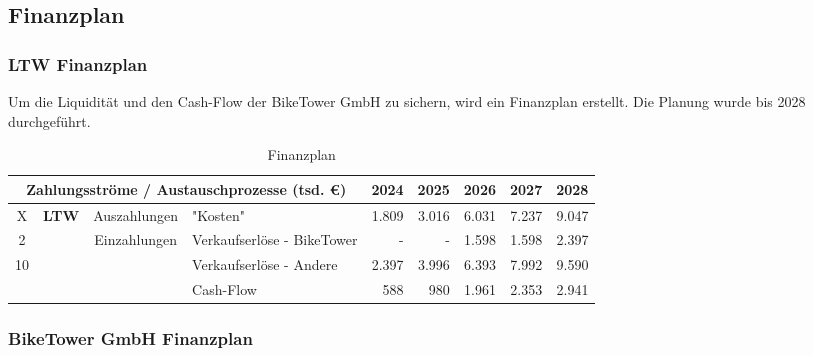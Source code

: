 \subsection{Finanzplan}

\subsubsection{LTW Finanzplan}

Um die Liquidität und den Cash-Flow der BikeTower GmbH zu sichern, wird ein Finanzplan erstellt. Die Planung wurde bis 2028 durchgeführt.

\begin{table}[H]
  \small
  \centering
  \begin{tabular}{ccclrrrrr}
    \toprule
    \multicolumn{4}{c}{\textbf{Zahlungsströme / Austauschprozesse} (tsd. \euro)} & \textbf{2024}                 & \textbf{2025}                 & \textbf{2026}              & \textbf{2027} & \textbf{2028}                         \\
    \midrule
    X                                                                            & \multirow{3}{*}{\textbf{LTW}} & Auszahlungen                  & "Kosten"                   & 1.809         & 3.016         & 6.031 & 7.237 & 9.047 \\
    2                                                                            &                               & \multirow{2}{*}{Einzahlungen} & Verkaufserlöse - BikeTower & -             & -             & 1.598 & 1.598 & 2.397 \\
    10                                                                           &                               &                               & Verkaufserlöse - Andere    & 2.397         & 3.996         & 6.393 & 7.992 & 9.590 \\
    \midrule
                                                                                 &                               &                               & Cash-Flow                  & 588           & 980           & 1.961 & 2.353 & 2.941 \\

    \bottomrule
  \end{tabular}
  \caption{Finanzplan}
  \label{tab:finanzplan}
\end{table}

\clearpage
\subsubsection{BikeTower GmbH Finanzplan}

